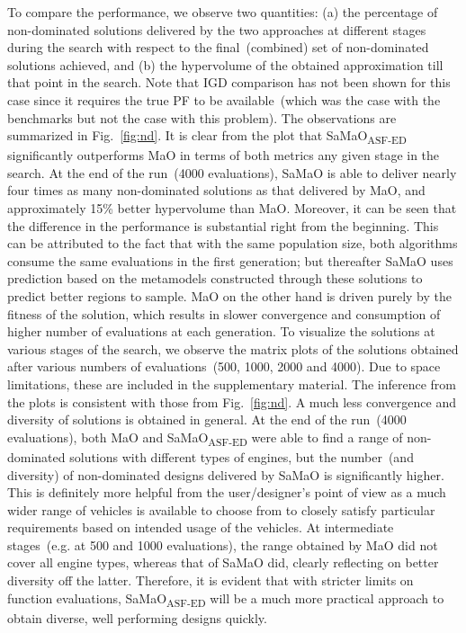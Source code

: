 \documentclass[twocolumn,10pt]{asme2ej}
\begin{document}
{\color{blue}To compare the performance, we observe two quantities: (a) the percentage of non-dominated solutions delivered by the two approaches at different stages during the search with respect to the final~(combined) set of non-dominated solutions achieved, and (b) the hypervolume of the obtained approximation till that point in the search. Note that IGD comparison has not been shown for this case since it requires the true PF to be available~(which was the case with the benchmarks but not the case with this problem). The observations are summarized in Fig.~\ref{fig:nd}. It is clear from the plot that SaMaO\textsubscript{ASF-ED} significantly outperforms MaO in terms of both metrics any given stage in the search. At the end of the run~(4000 evaluations), SaMaO is able to deliver nearly four times as many non-dominated solutions as that delivered by MaO, and approximately 15\% better hypervolume than MaO. Moreover, it can be seen that the difference in the performance is substantial right from the beginning. This can be attributed to the fact that with the same population size, both algorithms consume the same evaluations in the first generation; but thereafter SaMaO uses prediction based on the metamodels constructed through these solutions to predict better regions to sample. MaO on the other hand is driven purely by the fitness of the solution, which results in slower convergence and consumption of higher number of evaluations at each generation.  To visualize the solutions at various stages of the search, we observe the matrix plots of the solutions obtained after various numbers of evaluations~(500, 1000, 2000 and 4000). Due to space limitations, these are included in the supplementary material. The inference from the plots is consistent with those from Fig.~\ref{fig:nd}. A much less convergence and diversity of solutions is obtained in general. At the end of the run~(4000 evaluations), both MaO and SaMaO\textsubscript{ASF-ED} were able to find a range of non-dominated solutions with different types of engines, but the number~(and diversity) of non-dominated designs delivered by SaMaO is significantly higher. This is definitely more helpful from the user/designer's point of view as a much wider range of vehicles is available to choose from to closely satisfy particular requirements based on intended usage of the vehicles. At intermediate stages~(e.g. at 500 and 1000 evaluations), the range obtained by MaO did not cover all engine types, whereas that of SaMaO did, clearly reflecting on better diversity off the latter. Therefore, it is evident that with stricter limits on function evaluations, SaMaO\textsubscript{ASF-ED} will be a much more practical approach to obtain diverse, well performing designs quickly. }
\end{document}

